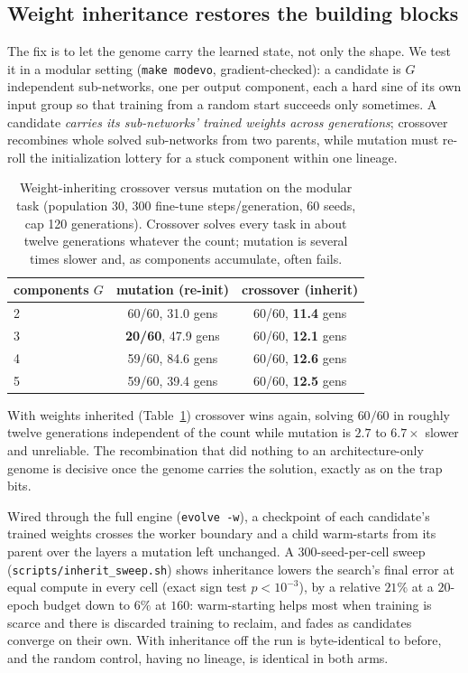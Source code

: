 \documentclass[11pt]{article}
\begin{document}
\subsection{Weight inheritance restores the building blocks}

The fix is to let the genome carry the learned state, not only the shape. We test it in
a modular setting (\texttt{make modevo}, gradient-checked): a candidate is $G$
independent sub-networks, one per output component, each a hard sine of its own input
group so that training from a random start succeeds only sometimes. A candidate
\emph{carries its sub-networks' trained weights across generations}; crossover
recombines whole solved sub-networks from two parents, while mutation must re-roll the
initialization lottery for a stuck component within one lineage.

\begin{table}[t]
\centering
\caption{Weight-inheriting crossover versus mutation on the modular task (population 30,
300 fine-tune steps/generation, 60 seeds, cap 120 generations). Crossover solves every
task in about twelve generations whatever the count; mutation is several times slower
and, as components accumulate, often fails.}
\label{tab:modevo}
\begin{tabular}{lcc}
\toprule
components $G$ & mutation (re-init) & crossover (inherit) \\
\midrule
2 & 60/60, 31.0 gens & 60/60, \textbf{11.4} gens \\
3 & \textbf{20/60}, 47.9 gens & 60/60, \textbf{12.1} gens \\
4 & 59/60, 84.6 gens & 60/60, \textbf{12.6} gens \\
5 & 59/60, 39.4 gens & 60/60, \textbf{12.5} gens \\
\bottomrule
\end{tabular}
\end{table}

With weights inherited (Table~\ref{tab:modevo}) crossover wins again, solving $60/60$ in
roughly twelve generations independent of the count while mutation is $2.7$ to
$6.7\times$ slower and unreliable. The recombination that did nothing to an
architecture-only genome is decisive once the genome carries the solution, exactly as
on the trap bits.

Wired through the full engine (\texttt{evolve -w}), a checkpoint of each candidate's
trained weights crosses the worker boundary and a child warm-starts from its parent
over the layers a mutation left unchanged. A $300$-seed-per-cell sweep
(\texttt{scripts/inherit\_sweep.sh}) shows inheritance lowers the search's final error
at equal compute in every cell (exact sign test $p<10^{-3}$), by a relative $21\%$ at a
$20$-epoch budget down to $6\%$ at $160$: warm-starting helps most when training is
scarce and there is discarded training to reclaim, and fades as candidates converge on
their own. With inheritance off the run is byte-identical to before, and the random
control, having no lineage, is identical in both arms.
\end{document}
